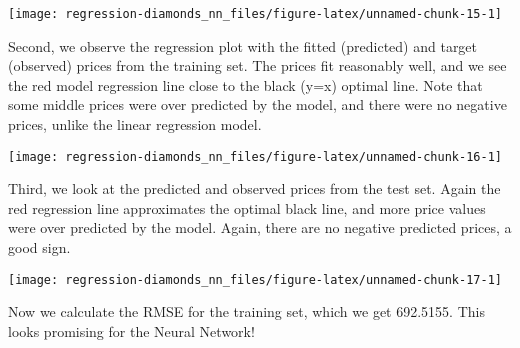 \documentclass[]{book}
\newenvironment{Shaded}{\begin{snugshade}}{\end{snugshade}}
\newcommand{\CommentTok}[1]{\textcolor[rgb]{0.56,0.35,0.01}{\textit{#1}}}
\newcommand{\DataTypeTok}[1]{\textcolor[rgb]{0.13,0.29,0.53}{#1}}
\newcommand{\KeywordTok}[1]{\textcolor[rgb]{0.13,0.29,0.53}{\textbf{#1}}}
\newcommand{\NormalTok}[1]{#1}
\newcommand{\OperatorTok}[1]{\textcolor[rgb]{0.81,0.36,0.00}{\textbf{#1}}}
\newcommand{\StringTok}[1]{\textcolor[rgb]{0.31,0.60,0.02}{#1}}
\begin{document}
\begin{center}\texttt{[image: regression-diamonds\_nn\_files/figure-latex/unnamed-chunk-15-1]} \end{center}

Second, we observe the regression plot with the fitted (predicted) and target (observed) prices from the training set. The prices fit reasonably well, and we see the red model regression line close to the black (y=x) optimal line. Note that some middle prices were over predicted by the model, and there were no negative prices, unlike the linear regression model.

\begin{Shaded}
\end{Shaded}

\begin{center}\texttt{[image: regression-diamonds\_nn\_files/figure-latex/unnamed-chunk-16-1]} \end{center}

Third, we look at the predicted and observed prices from the test set. Again the red regression line approximates the optimal black line, and more price values were over predicted by the model. Again, there are no negative predicted prices, a good sign.

\begin{Shaded}
\end{Shaded}

\begin{center}\texttt{[image: regression-diamonds\_nn\_files/figure-latex/unnamed-chunk-17-1]} \end{center}

Now we calculate the RMSE for the training set, which we get 692.5155. This looks promising for the Neural Network!
\end{document}
